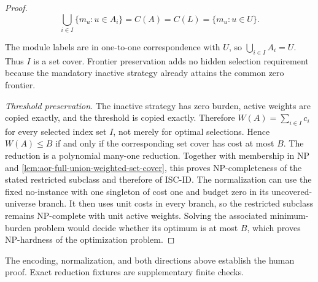 \begin{proof}
\[
 \bigcup_{i\in I}\{m_u:u\in A_i\}
   =C(A)=C(L)=\{m_u:u\in U\}.
\]

The module labels are in one-to-one correspondence with $U$, so
$\bigcup_{i\in I}A_i=U$. Thus $I$ is a set cover. Frontier preservation adds
no hidden selection requirement because the mandatory inactive strategy
already attains the common zero frontier.

\emph{Threshold preservation.}
The inactive strategy has zero burden, active weights are copied exactly, and
the threshold is copied exactly. Therefore
$W(A)=\sum_{i\in I}c_i$ for every selected index set $I$, not merely for
optimal selections. Hence $W(A)\leq B$ if and only if the corresponding set
cover has cost at most $B$. The reduction is a polynomial many-one reduction.
Together with membership in NP and
\cref{lem:aor-full-union-weighted-set-cover}, this proves NP-completeness of
the stated restricted subclass and therefore of \textsc{ISC-ID}. The
normalization can use the fixed no-instance with one singleton of cost one
and budget zero in its uncovered-universe branch. It then uses unit costs in
every branch, so the restricted subclass remains NP-complete with unit active
weights. Solving the associated
minimum-burden problem would decide whether its optimum is at most $B$, which
proves NP-hardness of the optimization problem.
\end{proof}


The encoding, normalization, and both directions above establish the human proof. Exact reduction fixtures are supplementary finite checks.
